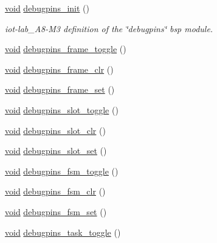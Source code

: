 \begin{DoxyCompactItemize}
\item 
\hyperlink{usb__devapi_8h_afabf60e7f57651d6d595a02c75f07cd0}{void} \hyperlink{group__debugpins_ga67b42e8786576ba76a5dbfd6b61bbf90}{debugpins\+\_\+init} ()
\begin{DoxyCompactList}\small\item\em iot-\/lab\+\_\+\+A8-\/\+M3 definition of the \char`\"{}debugpins\char`\"{} bsp module. \end{DoxyCompactList}\item 
\hyperlink{usb__devapi_8h_afabf60e7f57651d6d595a02c75f07cd0}{void} \hyperlink{group__debugpins_gaf5f2b7fbde11bd076c0c3e867653fa08}{debugpins\+\_\+frame\+\_\+toggle} ()
\item 
\hyperlink{usb__devapi_8h_afabf60e7f57651d6d595a02c75f07cd0}{void} \hyperlink{group__debugpins_gada37390552bee362863d82aa858f7aed}{debugpins\+\_\+frame\+\_\+clr} ()
\item 
\hyperlink{usb__devapi_8h_afabf60e7f57651d6d595a02c75f07cd0}{void} \hyperlink{group__debugpins_ga2a1a3edef66d4588cb179ee254935790}{debugpins\+\_\+frame\+\_\+set} ()
\item 
\hyperlink{usb__devapi_8h_afabf60e7f57651d6d595a02c75f07cd0}{void} \hyperlink{group__debugpins_gaa50950bd15a2a2ad12412ab5fbf0eb12}{debugpins\+\_\+slot\+\_\+toggle} ()
\item 
\hyperlink{usb__devapi_8h_afabf60e7f57651d6d595a02c75f07cd0}{void} \hyperlink{group__debugpins_ga46be7a970bd088dbf58868c806a90ff6}{debugpins\+\_\+slot\+\_\+clr} ()
\item 
\hyperlink{usb__devapi_8h_afabf60e7f57651d6d595a02c75f07cd0}{void} \hyperlink{group__debugpins_ga7707a462a0287f9c35fd70cd7ffbfa6a}{debugpins\+\_\+slot\+\_\+set} ()
\item 
\hyperlink{usb__devapi_8h_afabf60e7f57651d6d595a02c75f07cd0}{void} \hyperlink{group__debugpins_gaa140c9166f959c8bf59b2a5053e7318f}{debugpins\+\_\+fsm\+\_\+toggle} ()
\item 
\hyperlink{usb__devapi_8h_afabf60e7f57651d6d595a02c75f07cd0}{void} \hyperlink{group__debugpins_gaba8ca5762f3946abe08a2fd60f526018}{debugpins\+\_\+fsm\+\_\+clr} ()
\item 
\hyperlink{usb__devapi_8h_afabf60e7f57651d6d595a02c75f07cd0}{void} \hyperlink{group__debugpins_gabf50b5145dad1b666f26d5ddbc824e40}{debugpins\+\_\+fsm\+\_\+set} ()
\item 
\hyperlink{usb__devapi_8h_afabf60e7f57651d6d595a02c75f07cd0}{void} \hyperlink{group__debugpins_ga99a18520e34187483e8914b69ef05afd}{debugpins\+\_\+task\+\_\+toggle} ()

\end{DoxyCompactItemize}
